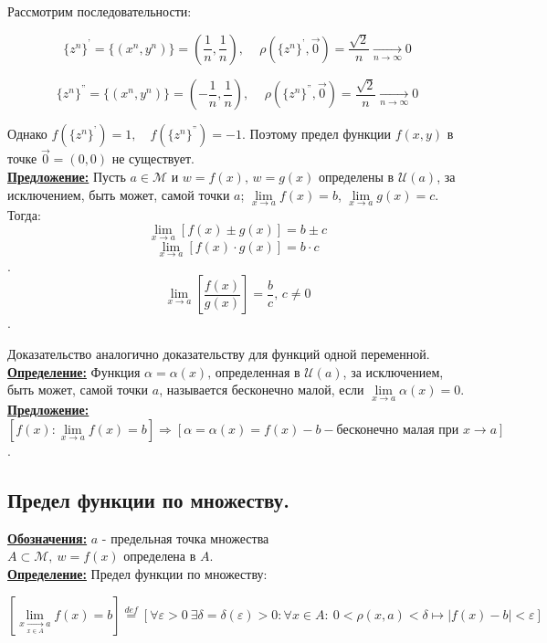 \documentclass[a4paper,12pt]{article} %
\begin{document}
Рассмотрим последовательности:

	$$\{z^n\}^\text{'} = \{(x^n, y^n)\} = \left(\frac{1}{n}, \frac{1}{n}\right) \text{, } \quad \rho(\{z^n\}^\text{'}, \vec{0}) = \frac{\sqrt2}{n} \xrightarrow[n \rightarrow \infty]{} 0$$
	
	$$\{z^n\}^\text{''} = \{(x^n, y^n)\} = \left(-\frac{1}{n}, \frac{1}{n}\right) \text{, } \quad \rho(\{z^n\}^\text{''}, \vec{0}) = \frac{\sqrt2}{n} \xrightarrow[n \rightarrow \infty]{} 0$$

Однако $f(\{z^n\}^\text{'}) = 1, \quad f(\{z^n\}^\text{''}) = -1$. Поэтому предел функции $f(x, y)$ в точке $\vec{0} = (0, 0)$ не существует.\\

\underline{\textbf{Предложение:}} Пусть $a \in \mathscr{M} \text{ и } w = f(x) \text{, } w = g(x)$ определены
	в $\mathscr{U}(a)$, за исключением, быть может, самой точки $a$;
	$\lim\limits_{x \to a}f(x) = b$, $\lim\limits_{x \to a}g(x) = c$. Тогда:
	$$\lim\limits_{x \to a}[f(x) \pm g(x) ] = b \pm c$$
	$$\lim\limits_{x \to a}[f(x) \cdot g(x) ] = b \cdot c$$.
	$$\lim\limits_{x \to a}\left[\frac{f(x)}{g(x)}\right] = \frac{b}{c} \text{, } c \neq 0$$.
	
Доказательство аналогично доказательству для функций одной переменной.\\

\underline{\textbf{Определение:}} Функция $\alpha = \alpha(x) \text{, определенная в }\mathscr{U}(a)$,
	за исключением, быть может, самой точки $a$, называется бесконечно малой, если
	$\lim\limits_{x \to a}\alpha(x) = 0$.\\
	
\underline{\textbf{Предложение:}}
	\\  [2 mm]
	$[f(x): \lim\limits_{x \to a}f(x) = b] \Rightarrow 
	[\alpha = \alpha(x) = f(x) - b -\text{бесконечно малая при } x \rightarrow a]$.\\

\subsection{Предел функции по множеству.}
\underline{\textbf{Обозначения:}}
	$a$ - предельная точка множества $A \subset \mathscr{M}, ~ w = f(x) \text{ определена в } A$. \\

\underline{\textbf{Определение:}} Предел функции по множеству:

$$[\lim\limits_{x \xrightarrow[x \in A]{} a}f(x) = b] \stackrel{def}{=} \left[\forall \varepsilon > 0 ~ 
\exists\delta = \delta(\varepsilon) > 0:
\forall x \in A: ~ 0 < \rho (x, a) < \delta \mapsto |f(x) - b| < \varepsilon\right]$$
\end{document}
